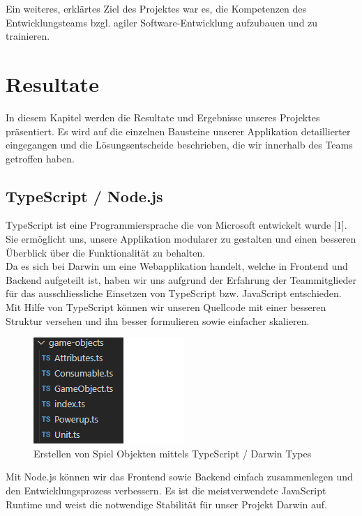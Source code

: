 \documentclass[11pt,a4paper,titlepage]{article}
\begin{document}
Ein weiteres, erklärtes Ziel des Projektes war es, die Kompetenzen des Entwicklungsteams bzgl. agiler Software-Entwicklung aufzubauen und zu trainieren.

\newpage

\section{Resultate}
In diesem Kapitel werden die Resultate und Ergebnisse unseres Projektes präsentiert.
Es wird auf die einzelnen Bausteine unserer Applikation detaillierter eingegangen und die Lösungsentscheide beschrieben, die wir innerhalb des Teams getroffen haben.

\subsection{TypeScript / Node.js}
TypeScript ist eine Programmiersprache die von Microsoft entwickelt wurde [1]. Sie ermöglicht uns, unsere Applikation modularer zu gestalten und einen besseren Überblick über die Funktionalität zu behalten.\\
Da es sich bei Darwin um eine Webapplikation handelt, welche in Frontend und Backend aufgeteilt ist, haben wir uns aufgrund der Erfahrung der Teammitglieder für das ausschliessliche Einsetzen von TypeScript bzw. JavaScript entschieden.
Mit Hilfe von TypeScript können wir unseren Quellcode mit einer besseren Struktur versehen und ihn besser formulieren sowie einfacher skalieren.

\begin{figure}[H]
	\includegraphics{darwintypes.png}
	\caption{Erstellen von Spiel Objekten mittels TypeScript / Darwin Types}
\end{figure}

Mit Node.js können wir das Frontend sowie Backend einfach zusammenlegen und den Entwicklungsprozess verbessern. Es ist die meistverwendete JavaScript Runtime und weist die notwendige Stabilität für unser Projekt Darwin auf.
\end{document}
